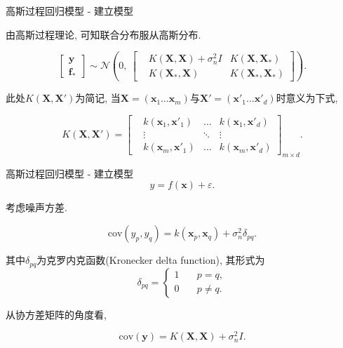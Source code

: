 \begin{frame}[fragile]{高斯过程回归模型 - 建立模型}

    由高斯过程理论, 可知联合分布服从高斯分布.
    
    $$\left[\begin{aligned}
        \boldsymbol{y}\ \\
        \boldsymbol{f}_{*}
    \end{aligned}\right]
    \sim\mathcal{N}\left(0,\
    \begin{bmatrix}
        &K(\boldsymbol{X}, \boldsymbol{X}) + \sigma^{2}_{n}I    &K(\boldsymbol{X}, \boldsymbol{X}_{*}) \\
        &K(\boldsymbol{X}_{*}, \boldsymbol{X}) &K(\boldsymbol{X}_{*}, \boldsymbol{X}_{*})
    \end{bmatrix}\right).$$

    此处$K(\boldsymbol{X},\boldsymbol{X}')$为简记, 当$\boldsymbol{X}=(\boldsymbol{x}_{1}\dots \boldsymbol{x}_{m})$与$\boldsymbol{X}'=(\boldsymbol{x}'_{1}\dots \boldsymbol{x}'_{d})$时意义为下式,

    $$K(\boldsymbol{X},\boldsymbol{X}')=  \begin{bmatrix}
        &k(\boldsymbol{x}_{1}, \boldsymbol{x}'_{1})   &\dots      &k(\boldsymbol{x}_{1}, \boldsymbol{x}'_{d}) \\
        &\vdots                                       &\ddots     &\vdots \\
        &k(\boldsymbol{x}_{m}, \boldsymbol{x}'_{1})   &\dots      &k(\boldsymbol{x}_{m}, \boldsymbol{x}'_{d})
    \end{bmatrix}_{m\times d}.$$

\end{frame}

\begin{frame}[fragile]{高斯过程回归模型 - 建立模型}
    $$y=f(\boldsymbol{x})+\varepsilon.$$

    考虑噪声方差.

    \begin{equation}
        \mathrm{cov}(y_{p},y_{q})=k(\boldsymbol{x}_{p}, \boldsymbol{x}_{q})+\sigma^{2}_{n}\delta_{pq}.
    \end{equation}

    其中$\delta_{pq}$为克罗内克函数(Kronecker delta function), 其形式为
    \begin{equation}
        \delta_{pq}=
        \begin{cases} 
            1 & \quad p=q,\\ 
            0 & \quad p\neq q.
        \end{cases}
    \end{equation}

    从协方差矩阵的角度看,

    \begin{equation}
        \mathrm{cov}(\boldsymbol{y})=K(\boldsymbol{X}, \boldsymbol{X}) + \sigma^{2}_{n}I.
    \end{equation}
\end{frame}

